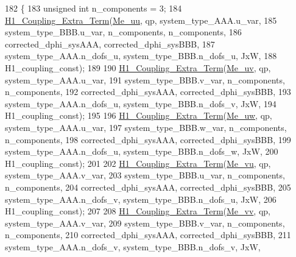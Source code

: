 \begin{DoxyCode}
182     \{
183         \textcolor{keywordtype}{unsigned} \textcolor{keywordtype}{int} n\_components = 3;
184         \hyperlink{weak__formulations_8cpp_a9fcc3dd62b4a38808d4cfdae87d771e4}{H1\_Coupling\_Extra\_Term}(\hyperlink{classcarl_1_1coupling__matrices__3_a9038b3af932d8a3cbca3662c6a071ff6}{Me\_uu}, qp, system\_type\_AAA.u\_var,
185                 system\_type\_BBB.u\_var, n\_components, n\_components,
186                 corrected\_dphi\_sysAAA, corrected\_dphi\_sysBBB,
187                 system\_type\_AAA.n\_dofs\_u, system\_type\_BBB.n\_dofs\_u, JxW,
188                 H1\_coupling\_const);
189 
190         \hyperlink{weak__formulations_8cpp_a9fcc3dd62b4a38808d4cfdae87d771e4}{H1\_Coupling\_Extra\_Term}(\hyperlink{classcarl_1_1coupling__matrices__3_a4ce35a3abfdcfa68633df7a7f1f685e0}{Me\_uv}, qp, system\_type\_AAA.u\_var,
191                 system\_type\_BBB.v\_var, n\_components, n\_components,
192                 corrected\_dphi\_sysAAA, corrected\_dphi\_sysBBB,
193                 system\_type\_AAA.n\_dofs\_u, system\_type\_BBB.n\_dofs\_v, JxW,
194                 H1\_coupling\_const);
195 
196         \hyperlink{weak__formulations_8cpp_a9fcc3dd62b4a38808d4cfdae87d771e4}{H1\_Coupling\_Extra\_Term}(\hyperlink{classcarl_1_1coupling__matrices__3_a11eb52d03c2c0520f87c75a89ed4d049}{Me\_uw}, qp, system\_type\_AAA.u\_var,
197                 system\_type\_BBB.w\_var, n\_components, n\_components,
198                 corrected\_dphi\_sysAAA, corrected\_dphi\_sysBBB,
199                 system\_type\_AAA.n\_dofs\_u, system\_type\_BBB.n\_dofs\_w, JxW,
200                 H1\_coupling\_const);
201 
202         \hyperlink{weak__formulations_8cpp_a9fcc3dd62b4a38808d4cfdae87d771e4}{H1\_Coupling\_Extra\_Term}(\hyperlink{classcarl_1_1coupling__matrices__3_a7f606b964255ab6db7df26647ca7676c}{Me\_vu}, qp, system\_type\_AAA.v\_var,
203                 system\_type\_BBB.u\_var, n\_components, n\_components,
204                 corrected\_dphi\_sysAAA, corrected\_dphi\_sysBBB,
205                 system\_type\_AAA.n\_dofs\_v, system\_type\_BBB.n\_dofs\_u, JxW,
206                 H1\_coupling\_const);
207 
208         \hyperlink{weak__formulations_8cpp_a9fcc3dd62b4a38808d4cfdae87d771e4}{H1\_Coupling\_Extra\_Term}(\hyperlink{classcarl_1_1coupling__matrices__3_af53f357fe4ae7938cefda80a92900bef}{Me\_vv}, qp, system\_type\_AAA.v\_var,
209                 system\_type\_BBB.v\_var, n\_components, n\_components,
210                 corrected\_dphi\_sysAAA, corrected\_dphi\_sysBBB,
211                 system\_type\_AAA.n\_dofs\_v, system\_type\_BBB.n\_dofs\_v, JxW,

\end{DoxyCode}

